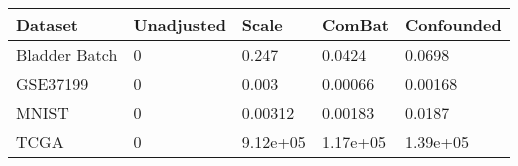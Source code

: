 \centering
\begin{tabular}{l|l|l|l|l}
\hline
Dataset & Unadjusted & Scale & ComBat & Confounded\\
\hline
\rowcolor{gray!6}  Bladder Batch & 0 & 0.247 & 0.0424 & 0.0698\\
\hline
GSE37199 & 0 & 0.003 & 0.00066 & 0.00168\\
\hline
\rowcolor{gray!6}  MNIST & 0 & 0.00312 & 0.00183 & 0.0187\\
\hline
TCGA & 0 & 9.12e+05 & 1.17e+05 & 1.39e+05\\
\hline
\end{tabular}